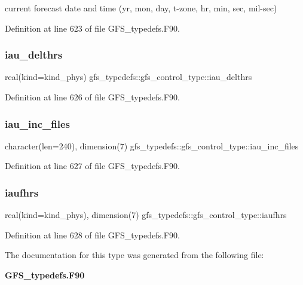 current forecast date and time (yr, mon, day, t-\/zone, hr, min, sec, mil-\/sec) 



Definition at line 623 of file G\+F\+S\+\_\+typedefs.\+F90.

\mbox{\label{structgfs__typedefs_1_1gfs__control__type_aaba2f9e0110ba0140828bf656956aa90}} 
\subsubsection{iau\+\_\+delthrs}
{\footnotesize\ttfamily real(kind=kind\+\_\+phys) gfs\+\_\+typedefs\+::gfs\+\_\+control\+\_\+type\+::iau\+\_\+delthrs}



Definition at line 626 of file G\+F\+S\+\_\+typedefs.\+F90.

\mbox{\label{structgfs__typedefs_1_1gfs__control__type_ae9e713f5bb2e29ed10e488843d80aba0}} 
\subsubsection{iau\+\_\+inc\+\_\+files}
{\footnotesize\ttfamily character(len=240), dimension(7) gfs\+\_\+typedefs\+::gfs\+\_\+control\+\_\+type\+::iau\+\_\+inc\+\_\+files}



Definition at line 627 of file G\+F\+S\+\_\+typedefs.\+F90.

\mbox{\label{structgfs__typedefs_1_1gfs__control__type_a0ad7f25987c3b576589aa486a199444f}} 
\subsubsection{iaufhrs}
{\footnotesize\ttfamily real(kind=kind\+\_\+phys), dimension(7) gfs\+\_\+typedefs\+::gfs\+\_\+control\+\_\+type\+::iaufhrs}



Definition at line 628 of file G\+F\+S\+\_\+typedefs.\+F90.



The documentation for this type was generated from the following file\+:\begin{DoxyCompactItemize}
\item 
\textbf{ G\+F\+S\+\_\+typedefs.\+F90}\end{DoxyCompactItemize}
